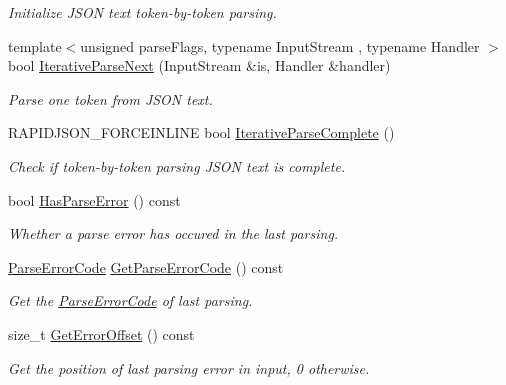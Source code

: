 \begin{DoxyCompactItemize}
\begin{DoxyCompactList}\small\item\em Initialize J\+S\+ON text token-\/by-\/token parsing. \end{DoxyCompactList}\item 
{\footnotesize template$<$unsigned parse\+Flags, typename Input\+Stream , typename Handler $>$ }\\bool \hyperlink{a00122_a257891331e0c259903e7066fb4cebf92}{Iterative\+Parse\+Next} (Input\+Stream \&is, Handler \&handler)
\begin{DoxyCompactList}\small\item\em Parse one token from J\+S\+ON text. \end{DoxyCompactList}\item 
R\+A\+P\+I\+D\+J\+S\+O\+N\+\_\+\+F\+O\+R\+C\+E\+I\+N\+L\+I\+NE bool \hyperlink{a00122_a835802fb87b44a09a8184785ed3b9213}{Iterative\+Parse\+Complete} ()
\begin{DoxyCompactList}\small\item\em Check if token-\/by-\/token parsing J\+S\+ON text is complete. \end{DoxyCompactList}\item 
bool \hyperlink{a00122_aa9d10652062557ebf26cf414bfeabf84}{Has\+Parse\+Error} () const \hypertarget{a00122_aa9d10652062557ebf26cf414bfeabf84}{}\label{a00122_aa9d10652062557ebf26cf414bfeabf84}

\begin{DoxyCompactList}\small\item\em Whether a parse error has occured in the last parsing. \end{DoxyCompactList}\item 
\hyperlink{a00832_ga8d4b32dfc45840bca189ade2bbcb6ba7}{Parse\+Error\+Code} \hyperlink{a00122_ac45a26246877c4daa85021ae67caa017}{Get\+Parse\+Error\+Code} () const \hypertarget{a00122_ac45a26246877c4daa85021ae67caa017}{}\label{a00122_ac45a26246877c4daa85021ae67caa017}

\begin{DoxyCompactList}\small\item\em Get the \hyperlink{a00832_ga8d4b32dfc45840bca189ade2bbcb6ba7}{Parse\+Error\+Code} of last parsing. \end{DoxyCompactList}\item 
size\+\_\+t \hyperlink{a00122_a77399ac40cca1fb113a2d507f476b4e7}{Get\+Error\+Offset} () const \hypertarget{a00122_a77399ac40cca1fb113a2d507f476b4e7}{}\label{a00122_a77399ac40cca1fb113a2d507f476b4e7}

\begin{DoxyCompactList}\small\item\em Get the position of last parsing error in input, 0 otherwise. \end{DoxyCompactList}\end{DoxyCompactItemize}
